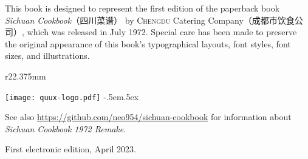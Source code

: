 This book is designed to represent the first edition of the paperback book
\textit{Sichuan Cookbook}{\kafamily（四川菜谱）}\!\! by \textsc{Chengdu}
Catering Company\!（成都市饮食公司）\!\!\!, which was released in July 1972.
Special care has been made to preserve the original appearance of this book's
typographical layouts, font styles, font sizes, and illustrations.

\begin{wrapfigure}{r}{22.375mm}%
\vspace{-2.8125\baselineskip}%
\begin{flushright}%
\texttt{[image: quux-logo.pdf]}%
{\sffamily\tiny\kern-.5em\lower.5ex\hbox{\texttrademark}}%
\end{flushright}%
\vspace{-1.75\baselineskip}%
\end{wrapfigure}%

See also \url{https://github.com/neo954/sichuan-cookbook} for information
about \textit{Sichuan Cookbook 1972 Remake}.

First electronic edition, April 2023.

\endgroup%


